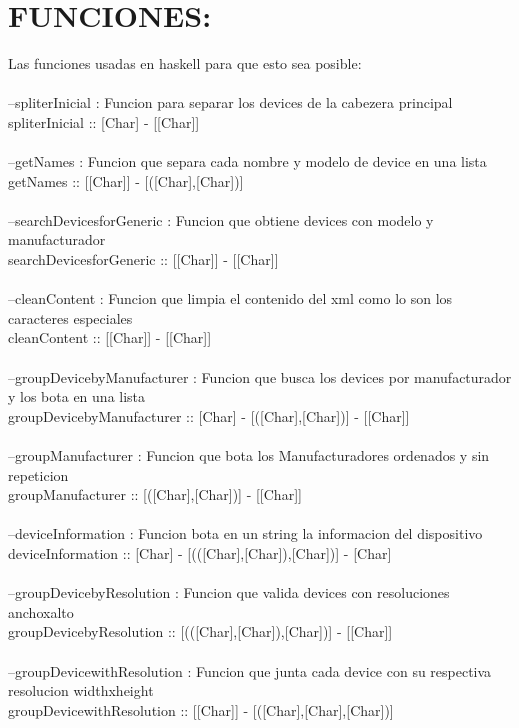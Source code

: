 \documentclass[11pt]{article} %
\begin{document}
\section{FUNCIONES:}
Las funciones usadas en haskell para que esto sea posible:\\\\
--spliterInicial : Funcion para separar los devices de la cabezera principal\\
spliterInicial :: [Char] - [[Char]]\\\\
--getNames : Funcion que separa cada nombre y modelo de device en una lista\\
getNames :: [[Char]] - [([Char],[Char])]\\\\
--searchDevicesforGeneric : Funcion que obtiene devices con modelo y manufacturador\\
searchDevicesforGeneric :: [[Char]] - [[Char]]\\\\
--cleanContent : Funcion que limpia el contenido del xml como lo son los caracteres especiales\\
cleanContent :: [[Char]] - [[Char]]\\\\
--groupDevicebyManufacturer : Funcion que busca los devices por manufacturador y los bota en una lista\\
groupDevicebyManufacturer :: [Char] - [([Char],[Char])] - [[Char]]\\\\
--groupManufacturer : Funcion que bota los Manufacturadores ordenados y sin repeticion\\
groupManufacturer :: [([Char],[Char])] - [[Char]]\\\\
--deviceInformation : Funcion bota en un string la informacion del dispositivo\\
deviceInformation :: [Char] - [(([Char],[Char]),[Char])] - [Char]\\\\
--groupDevicebyResolution : Funcion que valida devices con resoluciones anchoxalto\\
groupDevicebyResolution :: [(([Char],[Char]),[Char])] - [[Char]]\\\\
--groupDevicewithResolution : Funcion que junta cada device con su respectiva resolucion widthxheight\\
groupDevicewithResolution :: [[Char]] - [([Char],[Char],[Char])]\\\\
\end{document}
